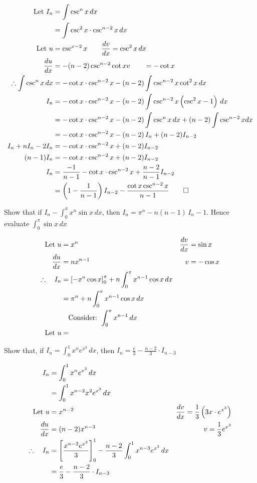 \documentclass{standalone}
\begin{document}
	\begin{align*}
		\text{Let } I_n &= \int \csc^nx \, dx\\
		&= \int \csc^2x \cdot \csc^{n-2}x \, dx\\
		\text{Let } u & = \csc^{x-2} x              \qquad \frac{dv}{dx} = \csc^2x \, dx \\
		\frac{du}{dx}     & = -(n-2)\csc^{n-2}\cot x  v \qquad = -\cot x                 \\
		\therefore \int \csc^nx \, dx &= -\cot x \cdot \csc^{n-2}x  - (n-2)\int \csc^{n-2}x\cot^2x \, dx\\
		I_n &= 	-\cot x \cdot \csc^{n-2}x - (n-2)\int \csc^{n-2}x\left(\csc^2x - 1\right) \, dx\\
		&= 		-\cot x \cdot \csc^{n-2}x - (n-2)\int \csc^{n}x\,dx + (n-2)\int\csc^{n-2}xdx\\
		&=-\cot x \cdot \csc^{n-2}x  - (n-2)\, I_n + (n-2)I_{n-2}\\
		I_n + nI_n -2I_n &= -\cot x\cdot \csc^{n-2}x  + (n-2)I_{n-2}\\
		(n-1)I_n &= -\cot x\cdot \csc^{n-2}x  + (n-2)I_{n-2}\\
		I_n &= \frac{-1}{n-1}-\cot x\cdot \csc^{n-2}x + \frac{n-2}{n-1}I_{n-2}\\
		&= \left(1-\frac{1}{n-1}\right)I_{n-2}-\frac{\cot x\csc^{n-2}x}{n-1}\qed
	\end{align*}
	\begin{example}
		Show that if $I_n - \int_0^\pi x^n\sin x\,dx$, then $I_n = \pi^n - n(n-1)\,I_n-1$. Hence evaluate $\int_0^\pi\sin x\,dx$
	\end{example}
	\begin{align*}
		\text{Let } u & = x^n      & \frac{dv}{dx} & = \sin x  \\
		\frac{du}{dx}     & = nx^{n-1} & v         & = -\cos x \\
		\therefore \quad I_n &=\left[-x^n\cos x\right]_0^\pi + n\int_0^\pi x^{n-1} \cos x \, dx\\
		&=\pi^n + n\int_0^\pi x^{n-1} \cos x \, dx\\
		&\quad \text{Consider: } \int_0^\pi x^{n-1} \, dx \\
		\text {Let } u &=
	\end{align*}
	\begin{example}
		Show that, if $I_n = \int_0^1 x^n e^{x^3} \, dx$, then $I_n =\frac{e}{3} - \frac{n-2}{3} \cdot I_{n-3}$
	\end{example}
	
	\begin{align*}
		I_n &= \int_0^1 x^n e^{x^3} \, dx\\
		&= \int_0^1 x^{n-2}x^2e^{x^3} \, dx\\
		\text{Let } u & = x^{n-2}       & \frac{dv}{dx} = \frac{1}3\left(3x\cdot e^{x^3}\right) \\
		\frac{du}{dx}       & = (n-2) x^{n-3} & v=\frac{1}3e^{x^3}                                \\
		\therefore \quad I_n &= \left[\frac{x^{n-2}e^{x^3}}3\right]_0^1 - \frac{n-2}3 \int_0^1 x^{n-3}{e^{x^3}} \, dx\\
		&= \frac{e}3 - \frac{n-2}3 \cdot I_{n-3}
	\end{align*}
	
\end{document}
